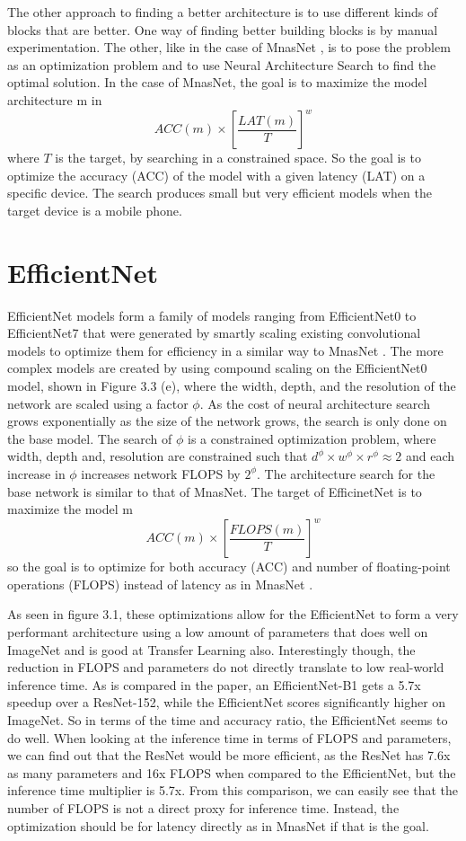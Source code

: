 The other approach to finding a better architecture is to use different kinds of blocks that are better. One way of finding better building blocks is by manual experimentation. The other, like in the case of MnasNet \citep{mnas}, is to pose the problem as an optimization problem and to use Neural Architecture Search \citep{neuralSearch} to find the optimal solution. In the case of MnasNet, the goal is to maximize the model architecture m in \[ACC(m) \times [\frac{LAT(m)}{T}]^w \] \noindent where ${T}$ is the target, by searching in a constrained space. So the goal is to optimize the accuracy (ACC) of the model with a given latency (LAT) on a specific device. The search produces small but very efficient models when the target device is a mobile phone.

\section{EfficientNet}
EfficientNet models form a family of models ranging from EfficientNet0 to EfficientNet7 that were generated by smartly scaling existing convolutional models to optimize them for efficiency in a similar way to MnasNet \citep{efficientNet}. 
The more complex models are created by using compound scaling on the EfficientNet0 model, shown in Figure 3.3 (e),  where the width, depth, and the resolution of the network are scaled using a factor ${\phi}$. 
As the cost of neural architecture search grows exponentially as the size of the network grows, the search is only done on the base model. 
The search of ${\phi}$ is a constrained optimization problem, where width, depth and, resolution are constrained such that ${d^\phi \times w^\phi \times r^\phi \approx 2}$ and each increase in ${\phi}$ increases network FLOPS by ${2^\phi}$. 
The architecture search for the base network is similar to that of MnasNet. The target of EfficinetNet is to maximize the model m  \[ACC(m) \times [\frac{FLOPS(m)}{T}]^w\] \noindent so the goal is to optimize for both accuracy (ACC) and number of floating-point operations (FLOPS) instead of latency as in MnasNet \citep{efficientNet}. 

As seen in figure 3.1, these optimizations allow for the EfficientNet to form a very performant architecture using a low amount of parameters that does well on ImageNet and is good at Transfer Learning also. Interestingly though, the reduction in FLOPS and parameters do not directly translate to low real-world inference time. As is compared in the paper, an EfficientNet-B1 gets a 5.7x speedup over a ResNet-152, while the EfficientNet scores significantly higher on ImageNet. So in terms of the time and accuracy ratio, the EfficientNet seems to do well. When looking at the inference time in terms of FLOPS and parameters, we can find out that the ResNet would be more efficient, as the ResNet has 7.6x as many parameters and 16x FLOPS when compared to the EfficientNet, but the inference time multiplier is 5.7x. From this comparison, we can easily see that the number of FLOPS is not a direct proxy for inference time. 
Instead, the optimization should be for latency directly as in MnasNet if that is the goal.

